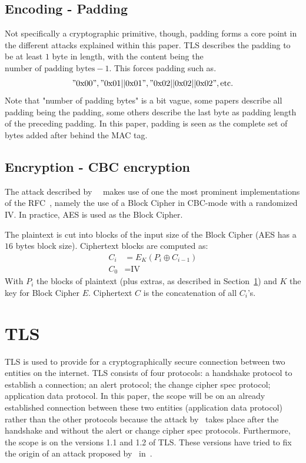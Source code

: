 \documentclass[10pt,conference,a4paper]{IEEEtran}
\begin{document}
\subsection{Encoding - Padding}
\label{sec:crypto:padding}
Not specifically a cryptographic primitive, though, padding forms a core point in the different attacks explained within this paper. TLS describes the padding to be at least $1$ byte in length, with the content being the $\text{number of padding bytes} - 1$. This forces padding such as.
\["0\text{x}00", "0\text{x}01||0\text{x}01", "0\text{x}02||0\text{x}02||0\text{x}02", \text{etc.} \]
Note that "number of padding bytes" is a bit vague, some papers describe all padding being the padding, some others describe the last byte as padding length of the preceding padding. In this paper, padding is seen as the complete set of bytes added after behind the MAC tag.

\subsection{Encryption - CBC encryption}
\label{sec:crypto:encryption}
The attack described by~\citeauthor{alfardan2013lucky}~\cite{alfardan2013lucky} makes use of one the most prominent implementations of the RFC~\cite{ietf2008transport}, namely the use of a Block Cipher in CBC-mode with a randomized IV. In practice, AES is used as the Block Cipher.

The plaintext is cut into blocks of the input size of the Block Cipher (AES has a $16$ bytes block size). Ciphertext blocks are computed as:
\[ 
\begin{split}
C_i &= E_K(P_i \oplus C_{i-1}) \\
C_0 &= \text{IV} 
\end{split}
\]
With $P_i$ the blocks of plaintext (plus extras, as described in Section~\ref{sec:tls}) and $K$ the key for Block Cipher $E$. Ciphertext $C$ is the concatenation of all $C_i$'s.




\section{TLS}
\label{sec:tls}
TLS is used to provide for a cryptographically secure connection between two entities on the internet. TLS consists of four protocols: a handshake protocol to establish a connection; an alert protocol; the change cipher spec protocol; application data protocol. In this paper, the scope will be on an already established connection between these two entities (application data protocol) rather than the other protocols because the attack by~\citeauthor{alfardan2013lucky} takes place after the handshake and without the alert or change cipher spec protocols. Furthermore, the scope is on the versions 1.1 and 1.2 of TLS. These versions have tried to fix the origin of an attack proposed by~\citeauthor{vaudenay2002security} in~\cite{vaudenay2002security}.
\end{document}
